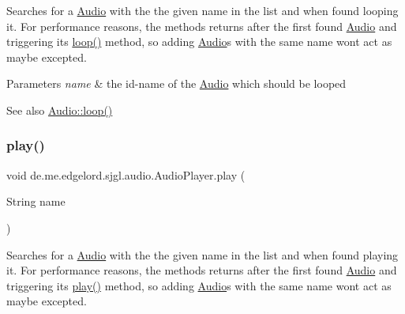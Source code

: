 Searches for a {\ttfamily \mbox{\hyperlink{classde_1_1me_1_1edgelord_1_1sjgl_1_1audio_1_1_audio}{Audio}}} with the the given name in the list and when found looping it. For performance reasons, the methods returns after the first found {\ttfamily \mbox{\hyperlink{classde_1_1me_1_1edgelord_1_1sjgl_1_1audio_1_1_audio}{Audio}}} and triggering its {\ttfamily \mbox{\hyperlink{classde_1_1me_1_1edgelord_1_1sjgl_1_1audio_1_1_audio_player_a4773c3bc2054fcb5f7892ebf330c68b8}{loop()}}} method, so adding {\ttfamily \mbox{\hyperlink{classde_1_1me_1_1edgelord_1_1sjgl_1_1audio_1_1_audio}{Audio}}}s with the same name won\textquotesingle{}t act as maybe excepted.


\begin{DoxyParams}{Parameters}
{\em name} & the id-\/name of the {\ttfamily \mbox{\hyperlink{classde_1_1me_1_1edgelord_1_1sjgl_1_1audio_1_1_audio}{Audio}}} which should be looped\\
\hline
\end{DoxyParams}
\begin{DoxySeeAlso}{See also}
\mbox{\hyperlink{classde_1_1me_1_1edgelord_1_1sjgl_1_1audio_1_1_audio_a654692b8ee1f0d298af938b2c76e6a54}{Audio\+::loop()}} 
\end{DoxySeeAlso}
\mbox{\label{classde_1_1me_1_1edgelord_1_1sjgl_1_1audio_1_1_audio_player_aecce0a524758259586949e7fb0c477d6}} 
\subsubsection{\texorpdfstring{play()}{play()}}
{\footnotesize\ttfamily void de.\+me.\+edgelord.\+sjgl.\+audio.\+Audio\+Player.\+play (\begin{DoxyParamCaption}\item[{String}]{name }\end{DoxyParamCaption})}

Searches for a {\ttfamily \mbox{\hyperlink{classde_1_1me_1_1edgelord_1_1sjgl_1_1audio_1_1_audio}{Audio}}} with the the given name in the list and when found playing it. For performance reasons, the methods returns after the first found {\ttfamily \mbox{\hyperlink{classde_1_1me_1_1edgelord_1_1sjgl_1_1audio_1_1_audio}{Audio}}} and triggering its {\ttfamily \mbox{\hyperlink{classde_1_1me_1_1edgelord_1_1sjgl_1_1audio_1_1_audio_player_aecce0a524758259586949e7fb0c477d6}{play()}}} method, so adding {\ttfamily \mbox{\hyperlink{classde_1_1me_1_1edgelord_1_1sjgl_1_1audio_1_1_audio}{Audio}}}s with the same name won\textquotesingle{}t act as maybe excepted.


